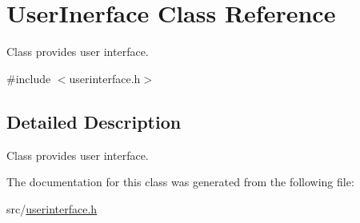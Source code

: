 \hypertarget{classUserInerface}{
\section{UserInerface Class Reference}
\label{d7/d8e/classUserInerface}
}


Class provides user interface.  




{\ttfamily \#include $<$userinterface.h$>$}



\subsection{Detailed Description}
Class provides user interface. 

The documentation for this class was generated from the following file:\begin{DoxyCompactItemize}
\item 
src/\hyperlink{userinterface_8h}{userinterface.h}\end{DoxyCompactItemize}
